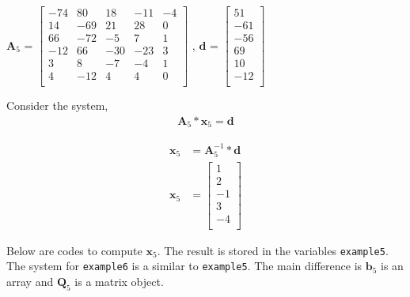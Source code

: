 \documentclass[a4paper]{article}
\begin{document}
$\boldsymbol{A}_{5}$ = $\begin{bmatrix}
 -74 &  80 &  18 & -11 & -4 \\
  14 & -69 &  21 &  28 & 0 \\ 
  66 & -72 &  -5 &   7 & 1 \\
 -12 &  66 & -30 & -23 & 3 \\
   3 &   8 &  -7 &  -4 & 1 \\
   4 & -12 &   4 &   4 & 0\\
\end{bmatrix}$ 
\hspace{0.5cm} , \hspace{0.5cm} 
$\boldsymbol{d}$ = $\begin{bmatrix}
51 \\
-61 \\
-56\\
 69\\
 10\\
 -12\\
\end{bmatrix}$

\vspace{0.5cm}

Consider the system,
\begin{equation*}
\begin{aligned}
\boldsymbol{A}_{5} * \boldsymbol{x}_{5}  = \boldsymbol{d} 
\end{aligned}
\end{equation*}





\begin{equation*}
\begin{aligned}
\boldsymbol{x}_{5}  &=  \boldsymbol{A}_{5}  ^{-1} * \boldsymbol{d}  \\
\boldsymbol{x}_{5}  &=
\begin{bmatrix} 
1 \\
2 \\
-1 \\
3 \\
-4 \\
\end{bmatrix}
\end{aligned}
\end{equation*}



Below are codes to compute $\boldsymbol{x}_{5}$. The result is stored in the variables \texttt{example5}. The system for \texttt{example6} is a similar to  \texttt{example5}. The main difference is $\boldsymbol{b}_{5}$ is an array and $\boldsymbol{Q}_{5}$ is a matrix object.
\end{document}
